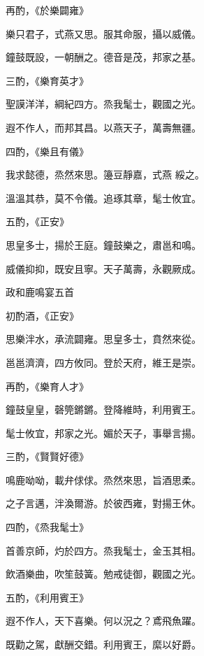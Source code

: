 \begin{pinyinscope}
 再酌，《於樂闢雍》



 樂只君子，式燕又思。服其命服，攝以威儀。



 鐘鼓既設，一朝酬之。德音是茂，邦家之基。



 三酌，《樂育英才》



 聖謨洋洋，綱紀四方。烝我髦士，觀國之光。



 遐不作人，而邦其昌。以燕天子，萬壽無疆。



 四酌，《樂且有儀》



 我求懿德，烝然來思。籩豆靜嘉，式燕
 綏之。



 溫溫其恭，莫不令儀。追琢其章，髦士攸宜。



 五酌，《正安》



 思皇多士，揚於王庭。鐘鼓樂之，肅邕和鳴。



 威儀抑抑，既安且寧。天子萬壽，永觀厥成。



 政和鹿鳴宴五首



 初酌酒，《正安》



 思樂泮水，承流闢雍。思皇多士，賁然來從。



 邕邕濟濟，四方攸同。登於天府，維王是崇。



 再酌，《樂育人才》



 鐘鼓皇皇，磬筦鏘鏘。登降維時，利用賓王。



 髦士攸宜，邦家之光。媚於天子，事舉言揚。



 三酌，《賢賢好德》



 鳴鹿呦呦，載弁俅俅。烝然來思，旨酒思柔。



 之子言邁，泮渙爾游。於彼西雍，對揚王休。



 四酌，《烝我髦士》



 首善京師，灼於四方。烝我髦士，金玉其相。



 飲酒樂曲，吹笙鼓簧。勉戒徒御，觀國之光。



 五酌，《利用賓王》



 遐不作人，天下喜樂。何以況之？鳶飛魚躍。



 既勸之駕，獻酬交錯。利用賓王，縻以好爵。



\end{pinyinscope}